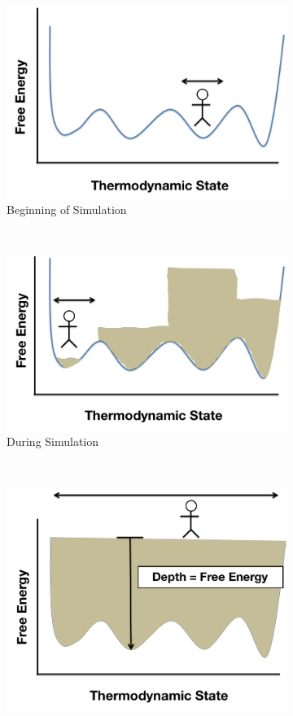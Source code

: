 \documentclass[9pt,review]{livecoms}
\begin{document}
\begin{figure}[ht]
\captionsetup{justification=centering}
\begin{subfigure}[b]{0.33\textwidth}
\includegraphics[width=\textwidth]{Figures/emptywell.png}
\caption{Beginning of Simulation}
 \label{fig:emptywell}
\end{subfigure}%
~
\begin{subfigure}[b]{0.33\textwidth}
\includegraphics[width=\textwidth]{Figures/halfwell.png}
\caption{During Simulation}
\label{fig:halfwell}
\end{subfigure}
~
\begin{subfigure}[b]{0.33\textwidth}
\includegraphics[width=\textwidth]{Figures/fullwell.png}

\end{subfigure}
\end{figure}
\end{document}
